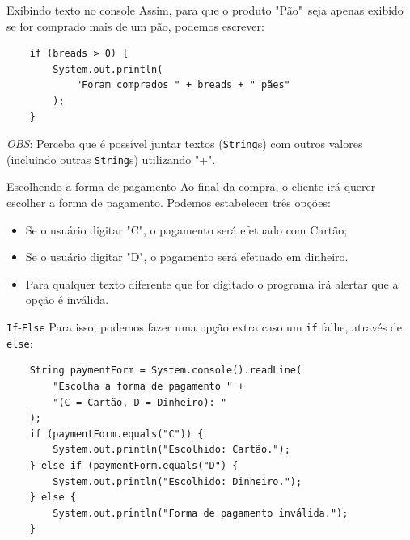 \documentclass{beamer}
\begin{document}
\begin{frame}[fragile]{Exibindo texto no console}
    Assim, para que o produto "Pão"\ seja apenas exibido se for comprado mais
    de um pão, podemos escrever:

    \begin{verbatim}
    if (breads > 0) {
        System.out.println(
            "Foram comprados " + breads + " pães"
        );
    }
    \end{verbatim}

    \emph{OBS}: Perceba que é possível juntar textos (\texttt{String}s) com
    outros valores (incluindo outras \texttt{String}s) utilizando "+".
\end{frame}

\begin{frame}{Escolhendo a forma de pagamento}
    Ao final da compra, o cliente irá querer escolher a forma de pagamento.
    Podemos estabelecer três opções:

    \begin{itemize}
        \item Se o usuário digitar "C", o pagamento será efetuado com Cartão;
        \item Se o usuário digitar "D", o pagamento será efetuado em dinheiro.
        \item Para qualquer texto diferente que for digitado o programa irá
            alertar que a opção é inválida.
    \end{itemize}
\end{frame}

\begin{frame}[fragile]{\texttt{If}-\texttt{Else}}
    Para isso, podemos fazer uma opção extra caso um \texttt{if} falhe, através
    de \texttt{else}:

    \begin{verbatim}
    String paymentForm = System.console().readLine(
        "Escolha a forma de pagamento " +
        "(C = Cartão, D = Dinheiro): "
    );
    if (paymentForm.equals("C")) {
        System.out.println("Escolhido: Cartão.");
    } else if (paymentForm.equals("D") {
        System.out.println("Escolhido: Dinheiro.");
    } else {
        System.out.println("Forma de pagamento inválida.");
    }
    \end{verbatim}
\end{frame}
\end{document}
